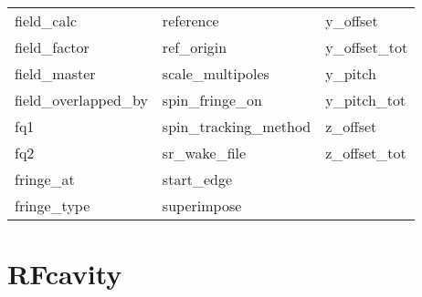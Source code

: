 \begin{tabular}{lll}
field_calc                  & reference                   & y_offset                    \\
field_factor                & ref_origin                  & y_offset_tot                \\
field_master                & scale_multipoles            & y_pitch                     \\
field_overlapped_by         & spin_fringe_on              & y_pitch_tot                 \\
fq1                         & spin_tracking_method        & z_offset                    \\
fq2                         & sr_wake_file                & z_offset_tot                \\
fringe_at                   & start_edge                  &                             \\
fringe_type                 & superimpose                 &                             \\
 \bottomrule
 \end{tabular}
 \vfill
 
 \section{RFcavity}
 \label{s:list.rfcavity}
 
